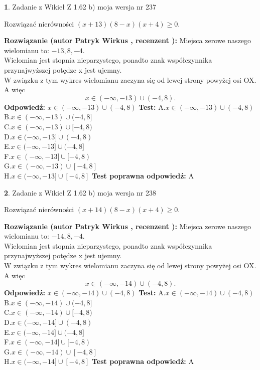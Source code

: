 \documentclass[12pt, a4paper]{article}
\theoremstyle{definition} %
\newtheorem{zad}{}
\newcommand{\zadStart}[1]{\begin{zad}#1\newline}
\newcommand{\zadStop}{\end{zad}}
\newcommand{\rozwStart}[2]{\noindent \textbf{Rozwiązanie (autor #1 , recenzent #2): }\newline}
\newcommand{\rozwStop}{\newline}
\newcommand{\odpStart}{\noindent \textbf{Odpowiedź:}\newline}
\newcommand{\odpStop}{\newline}
\newcommand{\testStart}{\noindent \textbf{Test:}\newline}
\newcommand{\testStop}{\newline}
\newcommand{\kluczStart}{\noindent \textbf{Test poprawna odpowiedź:}\newline}
\newcommand{\kluczStop}{\newline}
\begin{document}
\zadStart{Zadanie z Wikieł Z 1.62 b) moja wersja nr 237}

Rozwiązać nierówności $(x+13)(8-x)(x+4)\ge0$.
\zadStop
\rozwStart{Patryk Wirkus}{}
Miejsca zerowe naszego wielomianu to: $-13, 8, -4$.\\
Wielomian jest stopnia nieparzystego, ponadto znak współczynnika przy\linebreak najwyższej potędze x jest ujemny.\\ W związku z tym wykres wielomianu zaczyna się od lewej strony powyżej osi OX. A więc $$x \in (-\infty,-13) \cup (-4,8).$$
\rozwStop
\odpStart
$x \in (-\infty,-13) \cup (-4,8)$
\odpStop
\testStart
A.$x \in (-\infty,-13) \cup (-4,8)$\\
B.$x \in (-\infty,-13) \cup (-4,8]$\\
C.$x \in (-\infty,-13) \cup [-4,8)$\\
D.$x \in (-\infty,-13] \cup (-4,8)$\\
E.$x \in (-\infty,-13] \cup (-4,8]$\\
F.$x \in (-\infty,-13] \cup [-4,8)$\\
G.$x \in (-\infty,-13) \cup [-4,8]$\\
H.$x \in (-\infty,-13] \cup [-4,8]$
\testStop
\kluczStart
A
\kluczStop



\zadStart{Zadanie z Wikieł Z 1.62 b) moja wersja nr 238}

Rozwiązać nierówności $(x+14)(8-x)(x+4)\ge0$.
\zadStop
\rozwStart{Patryk Wirkus}{}
Miejsca zerowe naszego wielomianu to: $-14, 8, -4$.\\
Wielomian jest stopnia nieparzystego, ponadto znak współczynnika przy\linebreak najwyższej potędze x jest ujemny.\\ W związku z tym wykres wielomianu zaczyna się od lewej strony powyżej osi OX. A więc $$x \in (-\infty,-14) \cup (-4,8).$$
\rozwStop
\odpStart
$x \in (-\infty,-14) \cup (-4,8)$
\odpStop
\testStart
A.$x \in (-\infty,-14) \cup (-4,8)$\\
B.$x \in (-\infty,-14) \cup (-4,8]$\\
C.$x \in (-\infty,-14) \cup [-4,8)$\\
D.$x \in (-\infty,-14] \cup (-4,8)$\\
E.$x \in (-\infty,-14] \cup (-4,8]$\\
F.$x \in (-\infty,-14] \cup [-4,8)$\\
G.$x \in (-\infty,-14) \cup [-4,8]$\\
H.$x \in (-\infty,-14] \cup [-4,8]$
\testStop
\kluczStart
A
\kluczStop
\end{document}
